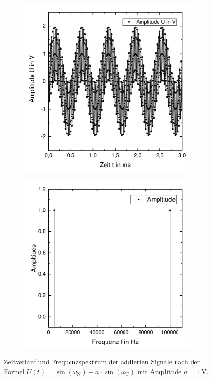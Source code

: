 \documentclass[a4paper,twoside,final]{article}
\begin{document}
\begin{figure}[htp]
    \centering
    \begin{subfigure}{0.45\textwidth}
        \includegraphics[width=\textwidth]{Bilder/Addition_Zeitverlauf.pdf}
    \end{subfigure}
    \begin{subfigure}{0.45\textwidth}
        \includegraphics[width=\textwidth]{Bilder/Addition_Frequenzverlauf.pdf}
    \end{subfigure}
    \label{fig:Addition}
    \caption{Zeitverlauf und Frequenzspektrum der addierten Signale nach der Formel $U(t) = \sin(\omega_\text{N}) + a\cdot \sin(\omega_\text{T})$ mit Amplitude $a = \SI{1}{\volt}$.}
\end{figure}\\
\end{document}
